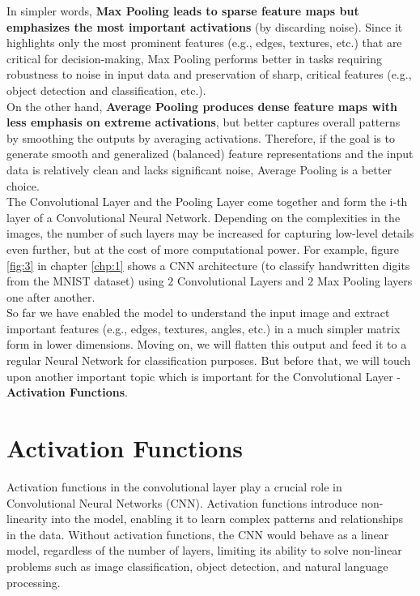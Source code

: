 In simpler words, \textbf{Max Pooling leads to sparse feature maps but emphasizes the most important activations} (by discarding noise). Since it highlights only the most prominent features (e.g., edges, textures, etc.) that are critical for decision-making, Max Pooling performs better in tasks requiring robustness to noise in input data and preservation of sharp, critical features (e.g., object detection and classification, etc.).\\

On the other hand, \textbf{Average Pooling produces dense feature maps with less emphasis on extreme activations}, but better captures overall patterns by smoothing the outputs by averaging activations. Therefore, if the goal is to generate smooth and generalized (balanced) feature representations and the input data is relatively clean and lacks significant noise, Average Pooling is a better choice.\\

The Convolutional Layer and the Pooling Layer come together and form the i-th layer of a Convolutional Neural Network. Depending on the complexities in the images, the number of such layers may be increased for capturing low-level details even further, but at the cost of more computational power. For example, figure \ref{fig:3} in chapter \ref{chp:1} shows a CNN architecture (to classify handwritten digits from the MNIST dataset) using $2$ Convolutional Layers and $2$ Max Pooling layers one after another.\\

So far we have enabled the model to understand the input image and extract important features (e.g., edges, textures, angles, etc.) in a much simpler matrix form in lower dimensions. Moving on, we will flatten this output and feed it to a regular Neural Network for classification purposes. But before that, we will touch upon another important topic which is important for the Convolutional Layer - \textbf{Activation Functions}.

\section{Activation Functions}
Activation functions in the convolutional layer play a crucial role in Convolutional Neural Networks (CNN). Activation functions introduce non-linearity into the model, enabling it to learn complex patterns and relationships in the data. Without activation functions, the CNN would behave as a linear model, regardless of the number of layers, limiting its ability to solve non-linear problems such as image classification, object detection, and natural language processing.\\

